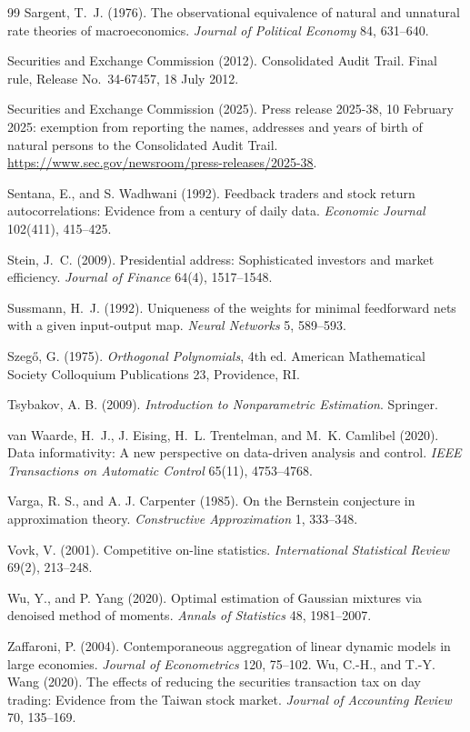 \documentclass[12pt]{article}
\theoremstyle{definition}
\theoremstyle{remark}
\begin{document}
\begin{thebibliography}{99}
 Sargent, T.~J. (1976). The observational equivalence of natural and unnatural rate theories of macroeconomics. \emph{Journal of Political Economy} 84, 631--640.

 Securities and Exchange Commission (2012). Consolidated Audit Trail. Final rule, Release No.~34-67457, 18 July 2012.

 Securities and Exchange Commission (2025). Press release 2025-38, 10 February 2025: exemption from reporting the names, addresses and years of birth of natural persons to the Consolidated Audit Trail. \url{https://www.sec.gov/newsroom/press-releases/2025-38}.

 Sentana, E., and S. Wadhwani (1992). Feedback traders and stock return autocorrelations: Evidence from a century of daily data. \emph{Economic Journal} 102(411), 415--425.

 Stein, J.~C. (2009). Presidential address: Sophisticated investors and market efficiency. \emph{Journal of Finance} 64(4), 1517--1548.

 Sussmann, H.~J. (1992). Uniqueness of the weights for minimal feedforward nets with a given input-output map. \emph{Neural Networks} 5, 589--593.

 Szeg\H{o}, G. (1975). \emph{Orthogonal Polynomials}, 4th ed. American Mathematical Society Colloquium Publications 23, Providence, RI.

 Tsybakov, A. B. (2009). \emph{Introduction to Nonparametric Estimation}. Springer.

 van Waarde, H.~J., J. Eising, H.~L. Trentelman, and M.~K. Camlibel (2020). Data informativity: A new perspective on data-driven analysis and control. \emph{IEEE Transactions on Automatic Control} 65(11), 4753--4768.

 Varga, R. S., and A. J. Carpenter (1985). On the Bernstein conjecture in approximation theory. \emph{Constructive Approximation} 1, 333--348.

 Vovk, V. (2001). Competitive on-line statistics. \emph{International Statistical Review} 69(2), 213--248.

 Wu, Y., and P. Yang (2020). Optimal estimation of Gaussian mixtures via denoised method of moments. \emph{Annals of Statistics} 48, 1981--2007.

 Zaffaroni, P. (2004). Contemporaneous aggregation of linear dynamic models in large economies. \emph{Journal of Econometrics} 120, 75--102.
 Wu, C.-H., and T.-Y. Wang (2020). The effects of reducing the securities transaction tax on day trading: Evidence from the Taiwan stock market. \emph{Journal of Accounting Review} 70, 135--169.
\end{thebibliography}
\end{document}
